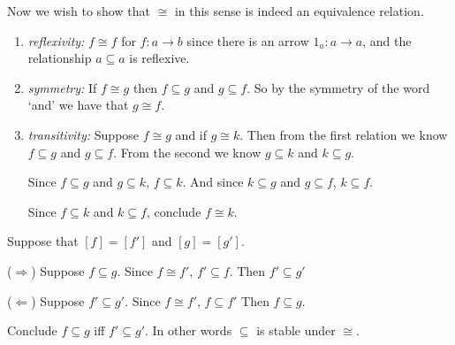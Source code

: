     \begin{exercise}
        Now we wish to show that $\cong$ in this sense is indeed an equivalence relation.
        \begin{enumerate}
            \item \emph{reflexivity: } $f \cong f$ for $f : a \to b$ since there is an arrow $1_a : a \to a$, and the relationship $a \subseteq a$ is reflexive.

            \item \emph{symmetry: } If $f \cong g$ then $f \subseteq g$ and $g \subseteq f$. So by the symmetry of the word `and' we have that $g \cong f$.

            \item \emph{transitivity: } Suppose $f \cong g$ and if $g \cong k$. Then from the first relation we know $f \subseteq g$ and $g \subseteq f$.  From the second we know $g \subseteq k$ and $k \subseteq g$.

            Since $f \subseteq g$ and $g \subseteq k$, $f \subseteq k$.
            And since $k \subseteq g$ and $g \subseteq f$, $k \subseteq f$.

            Since $f \subseteq k$ and $k \subseteq f$, conclude $f \cong k$.
        \end{enumerate}
    \end{exercise}

    \begin{exercise}
        Suppose that $[f] = [f']$ and $[g] = [g']$.

        ($\Rightarrow$) Suppose $f \subseteq g$.
        Since $f \cong f'$, $f' \subseteq f$.
        Then $f' \subseteq g'$
        
        ($\Leftarrow$) Suppose $f' \subseteq g'$.
        Since $f \cong f'$, $f \subseteq f'$
        Then $f \subseteq g$.
        
        Conclude $f \subseteq g$ iff $f' \subseteq g'$. In other words $\subseteq$ is stable under $\cong$.
    \end{exercise}

